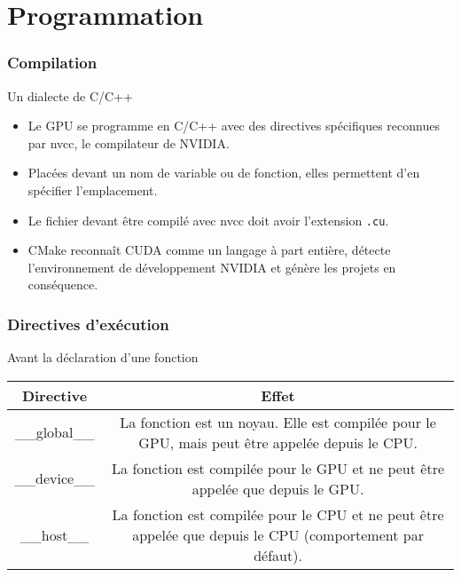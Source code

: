 \section{Programmation}
\begin{frame}
    \frametitle{Compilation}
\begin{block}{Un dialecte de C/C++}
    \begin{itemize}
        \item<+-> Le GPU se programme en C/C++ avec des directives spécifiques reconnues par nvcc, le 
        compilateur de NVIDIA.
        \item<+-> Placées devant un nom de variable ou de fonction, elles permettent d'en spécifier l'emplacement.
        \item<+-> Le fichier devant être compilé avec nvcc doit avoir l'extension \texttt{.cu}.
        \item<+-> CMake reconnaît CUDA comme un langage à part entière, détecte l'environnement de développement NVIDIA
        et génère les projets en conséquence.
    \end{itemize}
\end{block}
\end{frame}
\begin{frame}
    \frametitle{Directives d'exécution}
\begin{block}{Avant la déclaration d'une fonction}
    \renewcommand{\arraystretch}{3}
    \vskip 20pt
    \begin{tabular}{|c|c|}
        \hline
        \rowcolor{lightgray} Directive & Effet \\ \hline
        \_\_global\_\_ & \begin{minipage}{0.8\textwidth}
            La fonction est un noyau. Elle est compilée pour le GPU, mais peut être appelée depuis le CPU. 
        \end{minipage} \\ \hline
        \_\_device\_\_ & \begin{minipage}{0.8\textwidth}
            La fonction est compilée pour le GPU et ne peut être appelée que depuis le GPU. 
        \end{minipage} \\ \hline
        \_\_host\_\_ & \begin{minipage}{0.8\textwidth}
            La fonction est compilée pour le CPU et ne peut être appelée que depuis le CPU (comportement par défaut). 
        \end{minipage} \\ \hline
    \end{tabular}
\end{block}

\end{frame}
